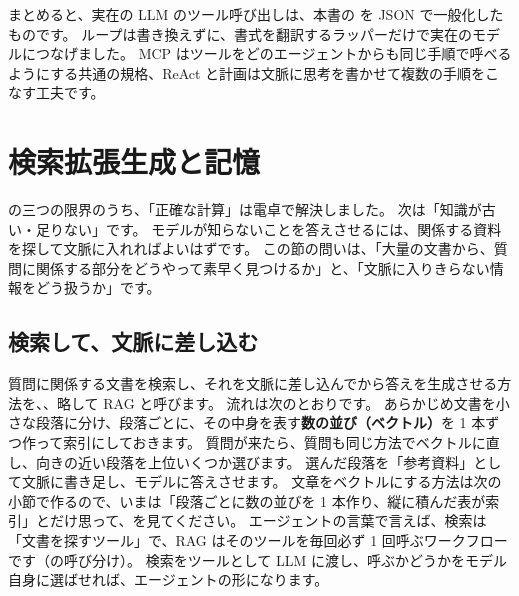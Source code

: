 まとめると、実在の LLM のツール呼び出しは、本書の  を JSON で一般化したものです。
ループは書き換えずに、書式を翻訳するラッパーだけで実在のモデルにつなげました。
MCP はツールをどのエージェントからも同じ手順で呼べるようにする共通の規格、ReAct と計画は文脈に思考を書かせて複数の手順をこなす工夫です。

\section{検索拡張生成と記憶}\label{sec:agent-rag}

の三つの限界のうち、「正確な計算」は電卓で解決しました。
次は「知識が古い・足りない」です。
モデルが知らないことを答えさせるには、関係する資料を探して文脈に入れればよいはずです。
この節の問いは、「大量の文書から、質問に関係する部分をどうやって素早く見つけるか」と、「文脈に入りきらない情報をどう扱うか」です。

\subsection{検索して、文脈に差し込む}

質問に関係する文書を検索し、それを文脈に差し込んでから答えを生成させる方法を、、略して RAG と呼びます\cite{lewis2020retrieval}。
流れは次のとおりです。
あらかじめ文書を小さな段落に分け、段落ごとに、その中身を表す\textbf{数の並び（ベクトル）}を 1 本ずつ作って索引にしておきます。
質問が来たら、質問も同じ方法でベクトルに直し、向きの近い段落を上位いくつか選びます。
選んだ段落を「参考資料」として文脈に書き足し、モデルに答えさせます。
文章をベクトルにする方法は次の小節で作るので、いまは「段落ごとに数の並びを 1 本作り、縦に積んだ表が索引」とだけ思って、を見てください。
エージェントの言葉で言えば、検索は「文書を探すツール」で、RAG はそのツールを毎回必ず 1 回呼ぶワークフローです（の呼び分け）。
検索をツールとして LLM に渡し、呼ぶかどうかをモデル自身に選ばせれば、エージェントの形になります。

